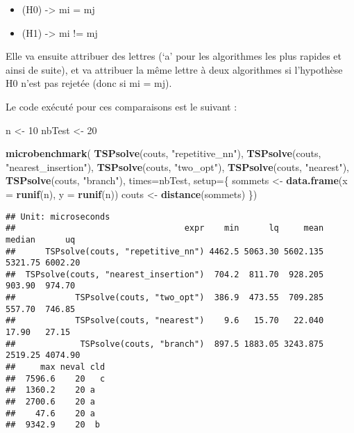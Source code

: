 \documentclass[
]{article}
\newenvironment{Shaded}{\begin{snugshade}}{\end{snugshade}}
\newcommand{\DataTypeTok}[1]{\textcolor[rgb]{0.13,0.29,0.53}{#1}}
\newcommand{\DecValTok}[1]{\textcolor[rgb]{0.00,0.00,0.81}{#1}}
\newcommand{\KeywordTok}[1]{\textcolor[rgb]{0.13,0.29,0.53}{\textbf{#1}}}
\newcommand{\NormalTok}[1]{#1}
\newcommand{\StringTok}[1]{\textcolor[rgb]{0.31,0.60,0.02}{#1}}
\providecommand{\tightlist}{%
  \setlength{\itemsep}{0pt}\setlength{\parskip}{0pt}}
\begin{document}
\begin{itemize}
\tightlist
\item
  (H0) -\textgreater{} mi = mj
\item
  (H1) -\textgreater{} mi != mj
\end{itemize}

Elle va ensuite attribuer des lettres (`a' pour les algorithmes les plus
rapides et ainsi de suite), et va attribuer la même lettre à deux
algorithmes si l'hypothèse H0 n'est pas rejetée (donc si mi = mj).

Le code exécuté pour ces comparaisons est le suivant :

\begin{Shaded}
\begin{Highlighting}[]
\NormalTok{  n      <-}\StringTok{ }\DecValTok{10}
\NormalTok{  nbTest <-}\StringTok{ }\DecValTok{20}

  \KeywordTok{microbenchmark}\NormalTok{(}
    \KeywordTok{TSPsolve}\NormalTok{(couts, }\StringTok{"repetitive_nn"}\NormalTok{),}
    \KeywordTok{TSPsolve}\NormalTok{(couts, }\StringTok{"nearest_insertion"}\NormalTok{),}
    \KeywordTok{TSPsolve}\NormalTok{(couts, }\StringTok{"two_opt"}\NormalTok{),}
    \KeywordTok{TSPsolve}\NormalTok{(couts, }\StringTok{"nearest"}\NormalTok{),}
    \KeywordTok{TSPsolve}\NormalTok{(couts, }\StringTok{"branch"}\NormalTok{),}
    \DataTypeTok{times=}\NormalTok{nbTest,}
    \DataTypeTok{setup=}\NormalTok{\{}
\NormalTok{      sommets <-}\StringTok{ }\KeywordTok{data.frame}\NormalTok{(}\DataTypeTok{x =} \KeywordTok{runif}\NormalTok{(n), }\DataTypeTok{y =} \KeywordTok{runif}\NormalTok{(n))}
\NormalTok{      couts <-}\StringTok{ }\KeywordTok{distance}\NormalTok{(sommets)}
\NormalTok{  \})}
\end{Highlighting}
\end{Shaded}

\begin{verbatim}
## Unit: microseconds
##                                  expr    min      lq     mean  median      uq
##      TSPsolve(couts, "repetitive_nn") 4462.5 5063.30 5602.135 5321.75 6002.20
##  TSPsolve(couts, "nearest_insertion")  704.2  811.70  928.205  903.90  974.70
##            TSPsolve(couts, "two_opt")  386.9  473.55  709.285  557.70  746.85
##            TSPsolve(couts, "nearest")    9.6   15.70   22.040   17.90   27.15
##             TSPsolve(couts, "branch")  897.5 1883.05 3243.875 2519.25 4074.90
##     max neval cld
##  7596.6    20   c
##  1360.2    20 a  
##  2700.6    20 a  
##    47.6    20 a  
##  9342.9    20  b
\end{verbatim}
\end{document}
